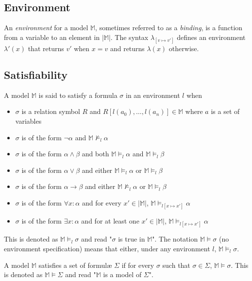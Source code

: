 	\subsection{Environment}

		An \emph{environment} for a model $\mathbb{M}$, sometimes referred to
		as a \emph{binding}, is a function from a variable to an element in
		$|\mathbb{M}|$. The syntax $\lambda_{[v \mapsto v']}$ defines an
		environment $\lambda'(x)$ that returns $v'$ when $x=v$ and returns
		$\lambda(x)$ otherwise.

	\subsection{Satisfiability}

		A model $\mathbb{M}$ is said to satisfy a formula $\sigma$ in an
		environment $l$ when
		\begin{itemize}
		\item $\sigma$ is a relation symbol $R$ and $R[l(a_0) , \ldots , l(a_n)] \in \mathbb{M}$ where $a$ is a set of variables
		\item $\sigma$ is of the form $\neg\alpha$ and $\mathbb{M} \not\models_l \alpha$
		\item $\sigma$ is of the form $\alpha\wedge\beta$ and both $\mathbb{M} \models_l \alpha$ and $\mathbb{M} \models_l \beta$
		\item $\sigma$ is of the form $\alpha\vee\beta$ and either $\mathbb{M} \models_l \alpha$ or $\mathbb{M} \models_l \beta$
		\item $\sigma$ is of the form $\alpha\to\beta$ and either $\mathbb{M} \not\models_l \alpha$ or $\mathbb{M} \models_l \beta$
		\item $\sigma$ is of the form $\forall x : \alpha$  and for every $x' \in |\mathbb{M}|$, $\mathbb{M} \models_{l[x \mapsto x']} \alpha$
		\item $\sigma$ is of the form $\exists x : \alpha$  and for at least one $x' \in |\mathbb{M}|$, $\mathbb{M} \models_{l[x \mapsto x']} \alpha$
		\end{itemize}
		This is denoted as $\mathbb{M} \models_l \sigma$ and read "$\sigma$ is
		true in $\mathbb{M}$". The notation $\mathbb{M} \models \sigma$ (no
		environment specification) means that either, under any environment
		$l$, $\mathbb{M} \models_l \sigma$.

		A model $\mathbb{M}$ satisfies a set of formul{\ae} $\Sigma$ if for every
		$\sigma$ such that $\sigma \in \Sigma$, $\mathbb{M} \models \sigma$.
		This is denoted as $\mathbb{M} \models \Sigma$ and read "$\mathbb{M}$
		is a model of $\Sigma$".

